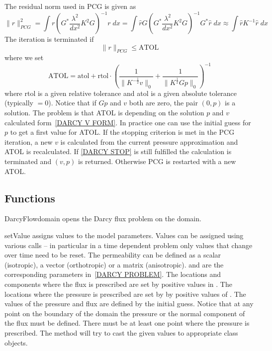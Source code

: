 The residual norm used in PCG is given as
\begin{equation}\label{DARCY R NORM}
\|r\|_{PCG}^2 = \int r (G^* \frac{\lambda^2}{dx^2} K^2 G)^{-1} r \; dx =\int \hat{r}  G ( G^* \frac{\lambda^2}{dx^2} K^2 G)^{-1}  G^* \hat{r} \; dx \approx
\int \hat{r} K^{-1}  \hat{r} \; dx 
\end{equation}
The iteration is terminated if
\begin{equation}\label{DARCY STOP}
\|r\|_{PCG} \le \mbox{ATOL}
\end{equation}
where we set
\begin{equation}\label{DARCY ATOL DEF}
\mbox{ATOL} = \mbox{atol} + \mbox{rtol} \cdot \left(\frac{1}{\|K^{-\frac{1}{2}}v\|_{0}} + \frac{1}{\|K^{\frac{1}{2}} G p\|_{0}} \right)^{-1} 
\end{equation}
where rtol is a given relative tolerance and atol is a given absolute
tolerance (typically $=0$).
Notice that if $Gp$ and $v$ both are zero, the pair $(0,p)$ is a solution.
The problem is that ATOL is depending on the solution $p$ and $v$ calculated
form~\ref{DARCY V FORM}.
In practice one can use the initial guess for $p$ to get a first value for ATOL.
If the stopping criterion is met in the PCG iteration, a new $v$ is calculated
from the current pressure approximation and ATOL is recalculated.
If \ref{DARCY STOP} is still fulfilled the calculation is terminated and
$(v,p)$ is returned. Otherwise PCG is restarted with a new ATOL.

\subsection{Functions}
\begin{classdesc}{DarcyFlow}{domain}
opens the Darcy flux problem on the \Domain domain.
\end{classdesc}

\begin{methoddesc}[DarcyFlow]{setValue}{}
assigns values to the model parameters. Values can be assigned using various
calls -- in particular in a time dependent problem only values that change
over time need to be reset. The permeability can be defined as a scalar
(isotropic), a vector (orthotropic) or a matrix (anisotropic).
 and  are the corresponding parameters in~\ref{DARCY PROBLEM}.
The locations and components where the flux is prescribed are set by positive
values in .
The locations where the pressure is prescribed are set by by positive values
of .
The values of the pressure and flux are defined by the initial guess.
Notice that at any point on the boundary of the domain the pressure or the
normal component of the flux must be defined. There must be at least one point
where the pressure is prescribed.
The method will try to cast the given values to appropriate \Data class objects.
\end{methoddesc}

